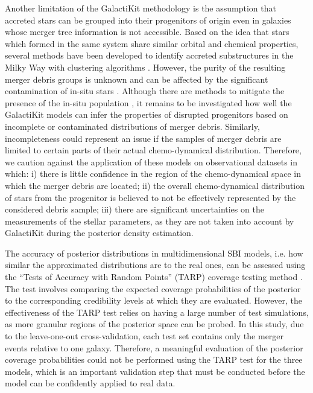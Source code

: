 Another limitation of the GalactiKit methodology is the assumption that accreted stars can be grouped into their progenitors of origin even in galaxies whose merger tree information is not accessible. Based on the idea that stars which formed in the same system share similar orbital and chemical properties, several methods have been developed to identify accreted substructures in the Milky Way with clustering algorithms \citep[e.g.,][]{Koppelman2019,Naidu2020,Dodd2023}. However, the purity of the resulting merger debris groups is unknown and can be affected by the significant contamination of in-situ stars \citep{Thomas2025}. Although there are methods to mitigate the presence of the in-situ population \citep{Sante2024}, it remains to be investigated how well the GalactiKit models can infer the properties of disrupted progenitors based on incomplete or contaminated distributions of merger debris. %
Similarly, incompleteness could represent an issue if the samples of merger debris are limited to certain parts of their actual chemo-dynamical distribution.  Therefore, we caution against the application of these models on observational datasets in which: i) there is little confidence in the region of the chemo-dynamical space in which the merger debris are located; ii)  the overall chemo-dynamical distribution of stars from the progenitor is believed to not be effectively represented by the considered debris sample; iii) there are significant uncertainties on the measurements of the stellar parameters, as they are not taken into account by GalactiKit during the posterior density estimation. 

The accuracy of posterior distributions in multidimensional SBI models, i.e. how similar the approximated distributions are to the real ones, can be assessed using the “Tests of Accuracy with Random Points” (TARP) coverage testing method \citep{Lemos2023}. The test involves comparing the expected coverage probabilities of the posterior to the corresponding credibility levels at which they are evaluated. However, the effectiveness of the TARP test relies on having a large number of test simulations, as more granular regions of the posterior space can be probed. In this study, due to the leave-one-out cross-validation, each test set contains only the merger events relative to one galaxy. Therefore, a meaningful evaluation of the posterior coverage probabilities could not be performed using the TARP test for the three models, which is an important validation step that must be conducted before the model can be confidently applied to real data.


